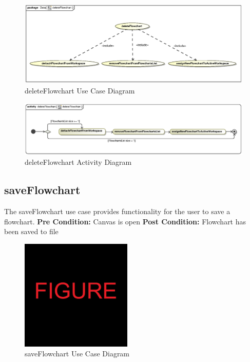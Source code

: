 \documentclass[11pt,a4paper,titlepage]{article}
\begin{document}
\begin{figure}[H]
  \centering
\includegraphics[width=500px]{deleteFlowchart.eps}
\caption{deleteFlowchart Use Case Diagram}
\end{figure}

\begin{figure}[H]
  \centering
\includegraphics[width=500px]{deleteFlowchartActivity.eps}
\caption{deleteFlowchart Activity Diagram}
\end{figure}

\newpage
\subsection{saveFlowchart}
The saveFlowchart use case provides functionality for the user to save a flowchart.\newline\newline
\textbf{Pre Condition:} Canvas is open\newline\newline
\textbf{Post Condition:} Flowchart has been saved to file

\begin{figure}[H]
  \centering
\includegraphics[width=200px]{figure.jpg}
\caption{saveFlowchart Use Case Diagram}
\end{figure}
\end{document}
